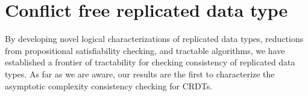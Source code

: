 \section{Conflict free replicated data type}
\label{sec:conclusion}

By developing novel logical characterizations of replicated data types, reductions from propositional satisfiability checking, and tractable algorithms, we have established a frontier of tractability for checking consistency of replicated data types. As far as we are aware, our results are the first to characterize the asymptotic complexity consistency checking for CRDTs.
